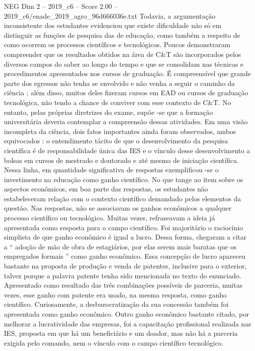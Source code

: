 \begin{textsample}{NEG Dim 2 – 2019\_c6 – Score 2.00 – 2019\_c6/enade\_2019\_agro\_96d666036e.txt}
Todavia, a argumentação inconsistente dos estudantes evidenciou que existe dificuldade não só em distinguir as funções de pesquisa das de educação, como também a respeito de como ocorrem os processos científicos e tecnológicos.
Poucos demonstraram compreender que os resultados obtidos na área de C\&T são incorporados pelos diversos campos do saber ao longo do tempo e que se consolidam nas técnicas e procedimentos apresentados nos cursos de graduação.
É compreensível que grande parte dos egressos não tenha se envolvido e não venha a seguir o caminho da ciência ; além disso, muitos deles fizeram cursos em EAD ou cursos de graduação tecnológica, não tendo a chance de conviver com esse contexto de C\&T.
No entanto, pelas próprias diretrizes do exame, supõe -se que a formação universitária deveria contemplar a compreensão dessas atividades.
Em uma visão incompleta da ciência, dois fatos importantes ainda foram observados, ambos equivocados : o entendimento tácito de que o desenvolvimento da pesquisa científica é de responsabilidade única das IES e o vínculo desse desenvolvimento a bolsas em cursos de mestrado e doutorado e até mesmo de iniciação científica.
Nessa linha, em quantidade significativa de respostas exemplificou -se o investimento na educação como ganho científico.
No que tange ao item sobre os aspectos econômicos, em boa parte das respostas, os estudantes não estabeleceram relação com o contexto científico demandado pelos elementos da questão.
Nas respostas, não se associavam os ganhos econômicos a qualquer processo científico ou tecnológico.
Muitas vezes, refraseavam a ideia já apresentada como resposta para o campo científico.
Foi majoritário o raciocínio simplista de que ganho econômico é igual a lucro.
Dessa forma, chegaram a citar a “ adoção de mão de obra de estagiários, por elas serem mais baratas que os empregados formais ” como ganho econômico.
Essa concepção de lucro apareceu bastante na proposta de produção e venda de patentes, inclusive para o exterior, talvez porque a palavra patente tenha sido mencionada no texto do enunciado.
Apresentado como resultado das três combinações possíveis de parceria, muitas vezes, esse ganho com patente era usado, na mesma resposta, como ganho científico.
Curiosamente, a desburocratização da sua concessão também foi apresentada como ganho econômico.
Outro ganho econômico bastante citado, por melhorar a lucratividade das empresas, foi a capacitação profissional realizada nas IES, proposta em que há um beneficiário e um doador, mas não há a parceria exigida pelo comando, nem o vínculo com o campo científico tecnológico.

\end{textsample}
